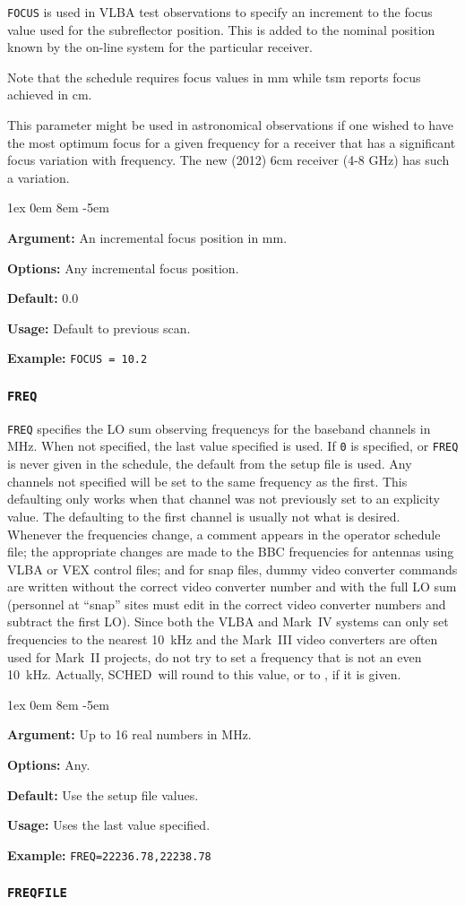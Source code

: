 \documentclass{report}
\newcommand{\schedb}{{\sc SCHED~}}
\newcommand{\rcwbox}[5]{
  \begin{list}{}{\parsep 1ex  \itemsep 0em
                 \leftmargin 8em  \itemindent -5em }
    \item {\bf Argument:} #1
    \item {\bf Options:}  #2
    \item {\bf Default:}  #3
    \item {\bf Usage:}    #4
    \item {\bf Example:}  #5
  \end{list}
}
\begin{document}
{\tt FOCUS} is used in VLBA test observations to specify an
increment to the focus value used for the subreflector position.
This is added to the nominal position known by the on-line system
for the particular receiver.

Note that the schedule requires focus values in mm while tsm
reports focus achieved in cm.

This parameter might be used in astronomical observations if one
wished to have the most optimum focus for a given frequency for a
receiver that has a significant focus variation with frequency.  The
new (2012) 6cm receiver (4-8 GHz) has such a variation.

\rcwbox
{An incremental focus position in mm.}
{Any incremental focus position.}
{0.0}
{Default to previous scan.}
{{\tt FOCUS = 10.2 }}

\subsubsection{\label{MP:FREQ}{\tt FREQ}}

{\tt FREQ} specifies the LO sum observing frequencys for the baseband
channels in MHz.  When not specified, the last value specified is
used. If {\tt 0} is specified, or {\tt FREQ} is never given in the
schedule, the default from the setup file is used.  Any channels not
specified will be set to the same frequency as the first.  This
defaulting only works when that channel was not previously set to an
explicity value.  The defaulting to the first channel is usually not
what is desired.  Whenever the frequencies change, a comment appears
in the operator schedule file; the appropriate changes are made to the
BBC frequencies for antennas using VLBA or VEX control files; and for
snap files, dummy video converter commands are written without the
correct video converter number and with the full LO sum (personnel at
``snap'' sites must edit in the correct video converter numbers and
subtract the first LO). Since both the VLBA and Mark~IV systems can
only set frequencies to the nearest 10~kHz and the Mark~III video
converters are often used for Mark~II projects, do not try to set a
frequency that is not an even 10~kHz.  Actually, \schedb will round to
this value, or to , if it is given.


\rcwbox
{Up to 16 real numbers in MHz.}
{Any.}
{Use the setup file values.}
{Uses the last value specified.}
{{\tt FREQ=22236.78,22238.78}}


\subsubsection{\label{MP:FREQFILE}{\tt FREQFILE}}
\end{document}

